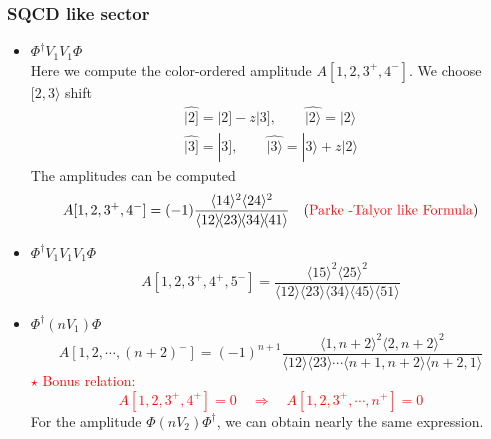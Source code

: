 \documentclass{beamer}
\newcommand{\aket}[1]{|#1\rangle}
\newcommand{\sket}[1]{|#1]}
\newcommand{\avg}[1]{\langle #1 \rangle}
\newcommand{\mdavg}[2]{\langle #1 \rangle\!\langle #2 \rangle}
\begin{document}
\begin{frame}
    \frametitle{SQCD like sector}
    \begin{itemize}
        \item $\Phi^\dagger V_1V_1\Phi$\\
        Here we compute the color-ordered amplitude $A[1,2,3^+,4^-]$. We choose $[2,3\rangle$ shift
        \begin{gather*}
        \hat{\sket{2}}=\sket{2}-z\sket{3},\qquad \hat{\aket{2}}=\aket{2} \\
        \hat{\sket{3}}=\sket{3},\qquad \hat{\aket{3}}=\aket{3}+z\aket{2}
        \end{gather*}
        The amplitudes can be computed 
        \begin{align*}
            A[1,2,3^+,4^-]=(-1)\frac{\avg{14}^2\avg{24}^2}{\mdavg{12}{23}\!\mdavg{34}{41}}\quad (\textcolor{red}{\text{Parke -Talyor like Formula}})
        \end{align*}
        \item $\Phi^\dagger V_1V_1V_1\Phi$
            \begin{equation*}
                A[1,2,3^+,4^+,5^-]=\frac{\avg{15}^2\!\avg{25}^2}{\mdavg{12}{23}\!\mdavg{34}{45}\!\avg{51}}
            \end{equation*}
    \end{itemize}
\end{frame}

\begin{frame}
    \begin{itemize}
        \item $\Phi^\dagger (nV_1)\Phi$
            \begin{equation*}
                A[1,2,\cdots,(n+2)^-]=(-1)^{n+1}\frac{\avg{1,n+2}^2\avg{2,n+2}^2}{\mdavg{12}{23}\cdots\mdavg{n+1,n+2}{n+2,1}}
            \end{equation*}
            \textcolor{red}{$\star$ Bonus relation: \begin{equation*}
                A[1,2,3^+,4^+]=0\quad \Rightarrow  \quad A[1,2,3^+,\cdots,n^+]=0 \end{equation*}}
        For the amplitude $\Phi (nV_2)\Phi^\dagger$, we can obtain nearly the same expression.
    \end{itemize}
\end{frame}
\end{document}
